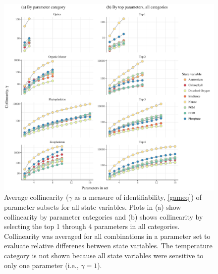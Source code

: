 \documentclass[preprint]{elsarticle}\usepackage[]{graphicx}\usepackage[]{color}
\makeatletter
\def\maxwidth{ %
  \ifdim\Gin@nat@width>\linewidth
    \linewidth
  \else
    \Gin@nat@width
  \fi
}
\makeatother
\begin{document}
\begin{figure}[!ht]

{\centering \includegraphics[width=\maxwidth]{figs/identploall-1} 

}

\caption[Average collinearity ($\gamma$ as a measure of identifiability, \cref{gameq}) of parameter subsets for all state variables]{Average collinearity ($\gamma$ as a measure of identifiability, \cref{gameq}) of parameter subsets for all state variables.  Plots in (a) show collinearity by parameter categories and (b) shows collinearity by selecting the top 1 through 4 parameters in all categories.  Collinearity was averaged for all combinations in a parameter set to evaluate relative differenes between state variables.  The temperature category is not shown because all state variables were sensitive to only one parameter (i.e., $\gamma = 1$).}\label{fig:identploall}
\end{figure}
\end{document}
